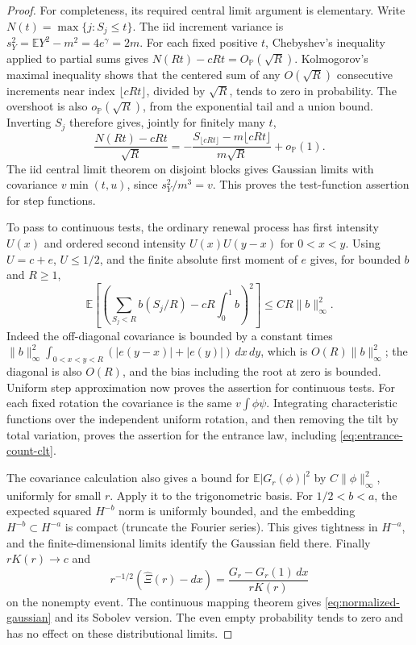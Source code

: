 \documentclass[11pt,letterpaper]{article}
\newcommand{\PP}{\mathbb P}\newcommand{\EE}{\mathbb E}
\begin{document}
\begin{proof}
For completeness, its required central limit argument is elementary.
Write $N(t)=\max\{j:S_j\le t\}$. The iid increment variance is
$s_Y^2=\EE Y^2-m^2=4e^\gamma=2m$.
For each fixed positive $t$, Chebyshev's inequality applied to partial
sums gives $N(Rt)-cRt=O_{\PP}(\sqrt R)$.
Kolmogorov's maximal inequality shows that the centered sum of any
$O(\sqrt R)$ consecutive increments near index $\lfloor cRt\rfloor$,
divided by $\sqrt R$, tends to zero in probability. The overshoot is
also $o_{\PP}(\sqrt R)$, from the exponential tail and a union bound.
Inverting $S_j$ therefore gives, jointly for finitely many $t$,
\[
 \frac{N(Rt)-cRt}{\sqrt R}
 =-\frac{S_{\lfloor cRt\rfloor}-m\lfloor cRt\rfloor}
           {m\sqrt R}+o_{\PP}(1).
\]
The iid central limit theorem on disjoint blocks gives Gaussian limits
with covariance $v\min(t,u)$, since $s_Y^2/m^3=v$.
This proves the test-function assertion for step functions.

To pass to continuous tests, the ordinary renewal process has first
intensity $U(x)$ and ordered second intensity $U(x)U(y-x)$ for $0<x<y$.
Using $U=c+e$, $U\le1/2$, and the finite absolute first moment of $e$
gives, for bounded $b$ and $R\ge1$,
\[
 \EE\left[\left(\sum_{S_j<R}b(S_j/R)-cR\int_0^1b\right)^2\right]
       \le C R\|b\|_\infty^2.
\]
Indeed the off-diagonal covariance is bounded by a constant times
$\|b\|_\infty^2\int_{0<x<y<R}(|e(y-x)|+|e(y)|)\,dx\,dy$,
which is $O(R)\|b\|_\infty^2$; the diagonal is also $O(R)$, and the
bias including the root at zero is bounded. Uniform step approximation
now proves the assertion for continuous tests.
For each fixed rotation the covariance is the same $v\int\phi\psi$.
Integrating characteristic functions over the independent uniform
rotation, and then removing the tilt by total variation, proves the
assertion for the entrance law, including \eqref{eq:entrance-count-clt}.

The covariance calculation also gives a bound for
$\EE|G_r(\phi)|^2$ by $C\|\phi\|_\infty^2$, uniformly for small $r$.
Apply it to the trigonometric basis. For $1/2<b<a$, the expected squared
$H^{-b}$ norm is uniformly bounded, and the embedding
$H^{-b}\subset H^{-a}$ is compact (truncate the Fourier series).
This gives tightness in $H^{-a}$, and the finite-dimensional limits
identify the Gaussian field there. Finally $rK(r)\to c$ and
\[
 r^{-1/2}(\widehat\Xi(r)-dx)
       =\frac{G_r-G_r(1)\,dx}{rK(r)}
\]
on the nonempty event. The continuous mapping theorem gives
\eqref{eq:normalized-gaussian} and its Sobolev version. The even empty
probability tends to zero and has no effect on these distributional limits.
\end{proof}
\end{document}
